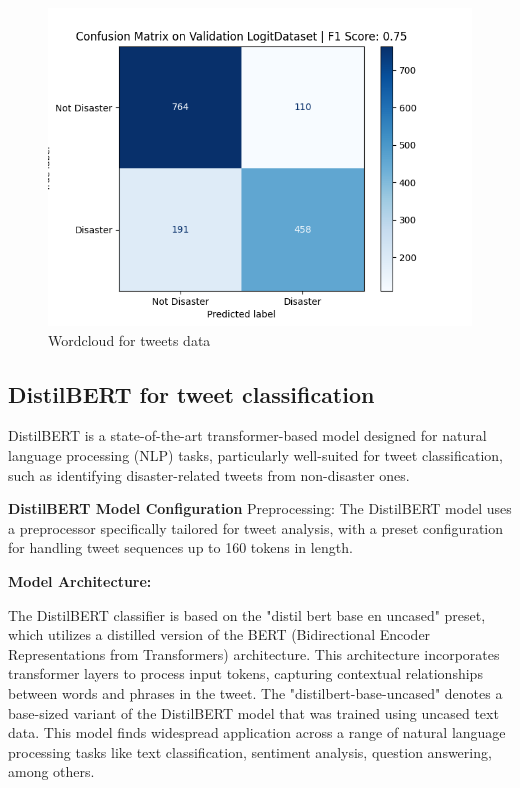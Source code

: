 \begin{figure}[ht]
    \centering
    \includegraphics[scale=0.7]{figures/LogisticRegression_Validation Logit_confusion_matrix.png}
    \caption{Wordcloud for tweets data}
\end{figure}

\newpage
\subsection{DistilBERT for tweet classification}

DistilBERT is a state-of-the-art transformer-based model designed for natural language processing (NLP) tasks, particularly well-suited for tweet classification, such as identifying disaster-related tweets from non-disaster ones.

\textbf{DistilBERT Model Configuration}
Preprocessing:
The DistilBERT model uses a preprocessor specifically tailored for tweet analysis, with a preset configuration for handling tweet sequences up to 160 tokens in length.


\textbf{Model Architecture:}

The DistilBERT classifier is based on the "distil bert base en uncased" preset, which utilizes a distilled version of the BERT (Bidirectional Encoder Representations from Transformers) architecture. This architecture incorporates transformer layers to process input tokens, capturing contextual relationships between words and phrases in the tweet.
The "distilbert-base-uncased" denotes a base-sized variant of the DistilBERT model that was trained using uncased text data. This model finds widespread application across a range of natural language processing tasks like text classification, sentiment analysis, question answering, among others.

